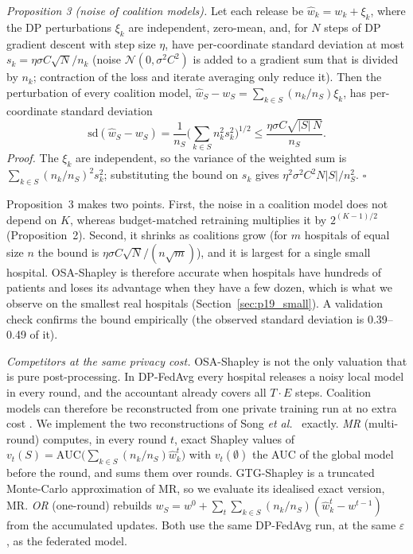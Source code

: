 \documentclass[journal]{IEEEtran}
\begin{document}
\emph{Proposition 3 (noise of coalition models).} Let each release be $\hat w_k = w_k + \xi_k$, where the DP perturbations $\xi_k$ are independent, zero-mean, and, for $N$ steps of DP gradient descent with step size $\eta$, have per-coordinate standard deviation at most $s_k = \eta\sigma C\sqrt{N}/n_k$ (noise $\mathcal N(0,\sigma^2C^2)$ is added to a gradient sum that is divided by $n_k$; contraction of the loss and iterate averaging only reduce it). Then the perturbation of every coalition model, $\hat w_S - w_S = \sum_{k\in S}(n_k/n_S)\xi_k$, has per-coordinate standard deviation
\begin{equation}
\mathrm{sd}(\hat w_S - w_S) = \frac{1}{n_S}\Big(\sum_{k\in S} n_k^2 s_k^2\Big)^{1/2} \le \frac{\eta\sigma C\sqrt{|S|\,N}}{n_S}.
\label{eq:prop3}
\end{equation}
\emph{Proof.} The $\xi_k$ are independent, so the variance of the weighted sum is $\sum_{k\in S}(n_k/n_S)^2 s_k^2$; substituting the bound on $s_k$ gives $\eta^2\sigma^2C^2 N|S|/n_S^2$. $\square$

Proposition~3 makes two points. First, the noise in a coalition model does not depend on $K$, whereas budget-matched retraining multiplies it by $2^{(K-1)/2}$ (Proposition~2). Second, it shrinks as coalitions grow (for $m$ hospitals of equal size $n$ the bound is $\eta\sigma C\sqrt{N}/(n\sqrt m)$), and it is largest for a single small hospital. OSA-Shapley is therefore accurate when hospitals have hundreds of patients and loses its advantage when they have a few dozen, which is what we observe on the smallest real hospitals (Section~\ref{sec:p19_small}). A validation check confirms the bound empirically (the observed standard deviation is 0.39--0.49 of it).

\emph{Competitors at the same privacy cost.} OSA-Shapley is not the only valuation that is pure post-processing. In DP-FedAvg every hospital releases a noisy local model in every round, and the accountant already covers all $T\cdot E$ steps. Coalition models can therefore be reconstructed from one private training run at no extra cost \cite{Song2019BlockchainFL, Wei2020DataValuation, Liu2022GTG}. We implement the two reconstructions of Song \emph{et al.}\ \cite{Song2019BlockchainFL} exactly. \emph{MR} (multi-round) computes, in every round $t$, exact Shapley values of $v_t(S) = \mathrm{AUC}\big(\sum_{k\in S}(n_k/n_S)\hat w_k^{t}\big)$ with $v_t(\emptyset)$ the AUC of the global model before the round, and sums them over rounds. GTG-Shapley \cite{Liu2022GTG} is a truncated Monte-Carlo approximation of MR, so we evaluate its idealised exact version, MR. \emph{OR} (one-round) rebuilds $w_S = w^0 + \sum_t\sum_{k\in S}(n_k/n_S)(\hat w_k^{t} - w^{t-1})$ from the accumulated updates. Both use the same DP-FedAvg run, at the same $\varepsilon$, as the federated model.
\end{document}
